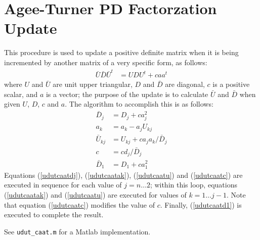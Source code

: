 \section{Agee-Turner PD Factorzation Update}

This procedure is used to update a positive definite matrix
when it is being incremented by another matrix of a
very specific form, as follows:
\begin{align}
  {\bar U} {\bar D} {\bar U}^t
  & = U D U^t + c a a^t
\label{udutcaat}
\end{align}
where
$U$ and ${\bar U}$ are unit upper triangular,
$D$ and ${\bar D}$ are diagonal,
$c$ is a positive scalar,
and $a$ is a vector;
the purpose of the update is to calculate
${\bar U}$ and ${\bar D}$
when given $U$, $D$, $c$ and $a$.
The algorithm to accomplish this is as follows:
\begin{subequations}
\begin{align}
  {\bar D}_j & = D_j + c a_j^2
\label{udutcaatdj}
\\
  a_k & = a_k - a_j U_{kj}
\label{udutcaatak}
\\
  {\bar U}_{kj} & = U_{kj} + c a_j a_k / {\bar D}_j
\label{udutcaatu}
\\
  c & = c d_j / {\bar D}_j
\label{udutcaatc}
\\
  {\bar D}_1 & = D_1 + c a_1^2
\label{udutcaatd1}
\end{align}
\end{subequations}
Equations
(\ref{udutcaatdj}),
(\ref{udutcaatak}),
(\ref{udutcaatu}) and
(\ref{udutcaatc})
are executed in sequence
for each value of $j = n \dots 2$;
within this loop,
equations
(\ref{udutcaatak}) and
(\ref{udutcaatu})
are executed for values of $k = 1 \dots j-1$.
Note that equation
(\ref{udutcaatc})
modifies the value of $c$.
Finally,
(\ref{udutcaatd1})
is executed to complete the result.

See \verb|udut_caat.m|
for a Matlab implementation.
